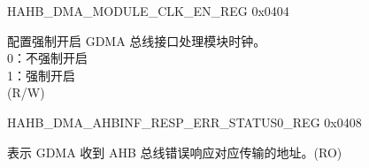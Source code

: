 \addtocounter{Regfloat}{-1}
\begin{register}{H}{AHB\_DMA\_MODULE\_CLK\_EN\_REG} {0x0404}
\begin{regdesc}\begin{reglist}
\item [接上页...]
\item
\label{fielddesc:AHBDMAAHBINFCLKEN}\item [AHB\_DMA\_AHBINF\_CLK\_EN] 配置强制开启 GDMA 总线接口处理模块时钟。\\
0：不强制开启\\
1：强制开启\\ (R/W)
\end{reglist}\end{regdesc}
\end{register}


\begin{register}{H}{AHB\_DMA\_AHBINF\_RESP\_ERR\_STATUS0\_REG} {0x0408}\label{regdesc:AHBDMAAHBINFRESPERRSTATUS0REG}
%
\regnewline%
\begin{regdesc}\begin{reglist}
\label{fielddesc:AHBDMAAHBINFRESPERRADDR}\item [AHB\_DMA\_AHBINF\_RESP\_ERR\_ADDR] 表示 GDMA 收到 AHB 总线错误响应对应传输的地址。(RO)
\end{reglist}\end{regdesc}
\end{register}


